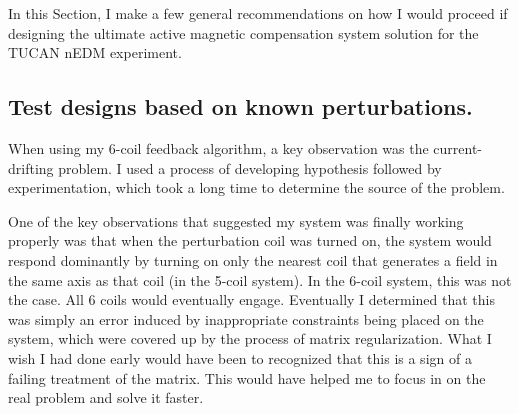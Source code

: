 
In this Section, I make a few general recommendations on how I would proceed if designing the ultimate active magnetic compensation system solution for the TUCAN nEDM experiment.


\subsection{Test designs based on known perturbations.\label{sec:sources}}

When using my 6-coil feedback algorithm, a key observation was the current-drifting problem.  I used a process of developing hypothesis followed by experimentation, which took a long time to determine the source of the problem.

One of the key observations that suggested my system was finally working properly was that when the perturbation coil was turned on, the system would respond dominantly by turning on only the nearest coil that generates a field in the same axis as that coil (in the 5-coil system). In the 6-coil system, this was not the case.  All 6 coils would eventually engage.  Eventually I determined that this was simply an error induced by inappropriate constraints being placed on the system, which were covered up by the process of matrix regularization. What I wish I had done early would have been to recognized that this is a sign of a failing treatment of the matrix.  This would have helped me to focus in on the real problem and solve it faster.


